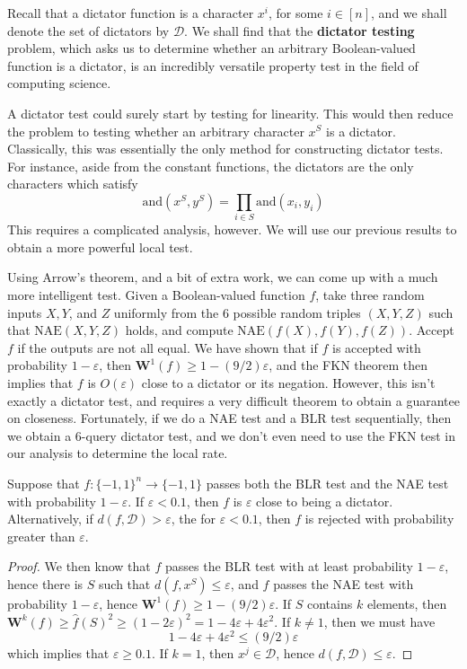 Recall that a dictator function is a character $x^i$, for some $i \in [n]$, and we shall denote the set of dictators by $\mathcal{D}$. We shall find that the {\bf dictator testing} problem, which asks us to determine whether an arbitrary Boolean-valued function is a dictator, is an incredibly versatile property test in the field of computing science.

A dictator test could surely start by testing for linearity. This would then reduce the problem to testing whether an arbitrary character $x^S$ is a dictator. Classically, this was essentially the only method for constructing dictator tests. For instance, aside from the constant functions, the dictators are the only characters which satisfy
%
\[ \text{and}(x^S, y^S) = \prod_{i \in S} \text{and}(x_i,y_i) \]
%
This requires a complicated analysis, however. We will use our previous results to obtain a more powerful local test.

Using Arrow's theorem, and a bit of extra work, we can come up with a much more intelligent test. Given a Boolean-valued function $f$, take three random inputs $X,Y$, and $Z$ uniformly from the 6 possible random triples $(X,Y,Z)$ such that $\text{NAE}(X,Y,Z)$ holds, and compute $\text{NAE}(f(X),f(Y),f(Z))$. Accept $f$ if the outputs are not all equal. We have shown that if $f$ is accepted with probability $1 - \varepsilon$, then $\mathbf{W}^1(f) \geq 1 - (9/2) \varepsilon$, and the FKN theorem then implies that $f$ is $O(\varepsilon)$ close to a dictator or its negation. However, this isn't exactly a dictator test, and requires a very difficult theorem to obtain a guarantee on closeness. Fortunately, if we do a NAE test and a BLR test sequentially, then we obtain a 6-query dictator test, and we don't even need to use the FKN test in our analysis to determine the local rate.

\begin{theorem}
    Suppose that $f: \{ -1, 1 \}^n \to \{ -1, 1 \}$ passes both the BLR test and the NAE test with probability $1 - \varepsilon$. If $\varepsilon < 0.1$, then $f$ is $\varepsilon$ close to being a dictator. Alternatively, if $d(f,\mathcal{D}) > \varepsilon$, the for $\varepsilon < 0.1$, then $f$ is rejected with probability greater than $\varepsilon$.
\end{theorem}
\begin{proof}
    We then know that $f$ passes the BLR test with at least probability $1 - \varepsilon$, hence there is $S$ such that $d(f,x^S) \leq \varepsilon$, and $f$ passes the NAE test with probability $1 - \varepsilon$, hence $\mathbf{W}^1(f) \geq 1 - (9/2) \varepsilon$. If $S$ contains $k$ elements, then $\mathbf{W}^k(f) \geq \widehat{f}(S)^2 \geq (1 - 2\varepsilon)^2 = 1 - 4\varepsilon + 4\varepsilon^2$. If $k \neq 1$, then we must have
    \[ 1 - 4 \varepsilon + 4 \varepsilon^2 \leq (9/2) \varepsilon \]
    which implies that $\varepsilon \geq 0.1$. If $k = 1$, then $x^j \in \mathcal{D}$, hence $d(f,\mathcal{D}) \leq \varepsilon$.
\end{proof}

